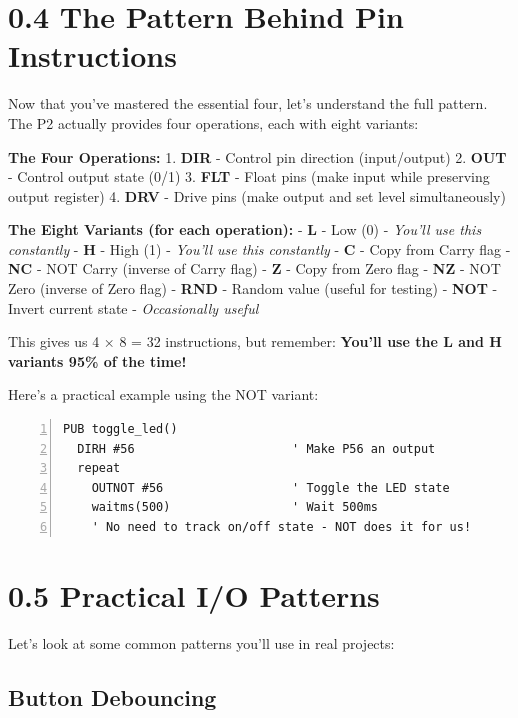 \documentclass[11pt,a4paper,oneside,english]{book}
\begin{document}
\hypertarget{the-pattern-behind-pin-instructions}{%
\section{0.4 The Pattern Behind Pin
Instructions}\label{the-pattern-behind-pin-instructions}}

Now that you've mastered the essential four, let's understand the full
pattern. The P2 actually provides four operations, each with eight
variants:

\textbf{The Four Operations:} 1. \textbf{DIR} - Control pin direction
(input/output) 2. \textbf{OUT} - Control output state (0/1) 3.
\textbf{FLT} - Float pins (make input while preserving output register)
4. \textbf{DRV} - Drive pins (make output and set level simultaneously)

\textbf{The Eight Variants (for each operation):} - \textbf{L} - Low (0)
- \emph{You'll use this constantly} - \textbf{H} - High (1) -
\emph{You'll use this constantly} - \textbf{C} - Copy from Carry flag -
\textbf{NC} - NOT Carry (inverse of Carry flag) - \textbf{Z} - Copy from
Zero flag - \textbf{NZ} - NOT Zero (inverse of Zero flag) - \textbf{RND}
- Random value (useful for testing) - \textbf{NOT} - Invert current
state - \emph{Occasionally useful}

This gives us 4 × 8 = 32 instructions, but remember: \textbf{You'll use
the L and H variants 95\% of the time!}

Here's a practical example using the NOT variant:

\begin{Spin2Block}
\begin{Verbatim}[numbers=left,numbersep=5pt,xleftmargin=15pt]
PUB toggle_led()
  DIRH #56                      ' Make P56 an output
  repeat
    OUTNOT #56                  ' Toggle the LED state
    waitms(500)                 ' Wait 500ms
    ' No need to track on/off state - NOT does it for us!
\end{Verbatim}
\end{Spin2Block}

\hypertarget{practical-io-patterns}{%
\section{0.5 Practical I/O Patterns}\label{practical-io-patterns}}

Let's look at some common patterns you'll use in real projects:

\hypertarget{button-debouncing}{%
\subsection{Button Debouncing}\label{button-debouncing}}
\end{document}
